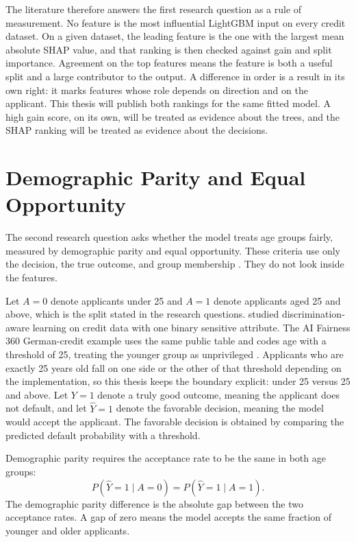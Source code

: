 The literature therefore answers the first research question as a rule of measurement. No feature is the most influential LightGBM input on every credit dataset. On a given dataset, the leading feature is the one with the largest mean absolute SHAP value, and that ranking is then checked against gain and split importance. Agreement on the top features means the feature is both a useful split and a large contributor to the output. A difference in order is a result in its own right: it marks features whose role depends on direction and on the applicant. This thesis will publish both rankings for the same fitted model. A high gain score, on its own, will be treated as evidence about the trees, and the SHAP ranking will be treated as evidence about the decisions.

\section{Demographic Parity and Equal Opportunity}
\label{sec:related-fairness}

The second research question asks whether the model treats age groups fairly, measured by demographic parity and equal opportunity. These criteria use only the decision, the true outcome, and group membership \citep{hardt2016equality}. They do not look inside the features.

Let \(A = 0\) denote applicants under 25 and \(A = 1\) denote applicants aged 25 and above, which is the split stated in the research questions. \citet{kamiran2012reweighing} studied discrimination-aware learning on credit data with one binary sensitive attribute. The AI Fairness 360 German-credit example uses the same public table and codes age with a threshold of 25, treating the younger group as unprivileged \citep{bellamy2019aif360, hofmann1994german}. Applicants who are exactly 25 years old fall on one side or the other of that threshold depending on the implementation, so this thesis keeps the boundary explicit: under 25 versus 25 and above. Let \(Y = 1\) denote a truly good outcome, meaning the applicant does not default, and let \(\hat{Y} = 1\) denote the favorable decision, meaning the model would accept the applicant. The favorable decision is obtained by comparing the predicted default probability with a threshold.

Demographic parity requires the acceptance rate to be the same in both age groups:
\begin{equation}
  P(\hat{Y} = 1 \mid A = 0) = P(\hat{Y} = 1 \mid A = 1).
  \label{eq:demographic-parity}
\end{equation}
The demographic parity difference is the absolute gap between the two acceptance rates. A gap of zero means the model accepts the same fraction of younger and older applicants.

